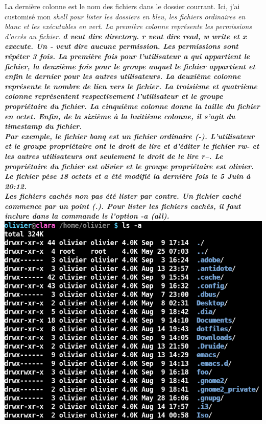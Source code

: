 \documentclass[12pt,oneside,final]{article}
\begin{document}
La dernière colonne est le nom des fichiers dans le dossier
courrant. Ici, j'ai customisé mon \it{shell} pour lister les dossiers
en bleu, les fichiers ordinaires en blanc et les exécutables en
vert. La première colonne représente les permissions d'accès au
fichier. \bf{d} veut dire \it{directory}. \bf{r} veut dire \it{read},
\bf{w} write et \bf{x} \it{execute}. Un \bf{-} veut dire aucune
permission. Les permissions sont répéter 3 fois. La première fois pour
l'utilisateur a qui appartient le fichier, la deuxième fois pour le
groupe auquel le fichier appartient et enfin le dernier pour les
autres utilisateurs. La deuxième colonne représente le nombre de lien
vers le fichier. La troisième et quatrième colonne représentent
respectivement l'utilisateur et le groupe propriétaire du fichier. La
cinquième colonne donne la taille du fichier en octet. Enfin, de la
sixième à la huitième colonne, il s'agit du \it{timestamp} du fichier. \\

Par exemple, le fichier \bf{banq} est un fichier ordinaire
(\bf{-}). L'utilisateur et le groupe propriétaire ont le droit de lire
et d'éditer le fichier \bf{rw-} et les autres utilisateurs ont
seulement le droit de le lire \bf{r--}. Le propriétaire du fichier est
\bf{olivier} et le groupe propriétaire est \bf{olivier}. Le fichier
pèse 18 octets et a été modifié la dernière fois le 5 Juin à 20:12. \\


Les fichiers cachés non pas été lister par contre. Un fichier caché
commence par un point (\bf{.}). Pour lister les fichiers cachés, il
faut inclure dans la commande \bf{ls}
l'option \bf{-a} (\bf{all}). \\

\includegraphics[scale=2]{bash_ls_2} \\
\end{document}
